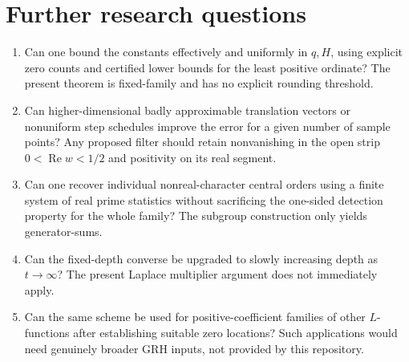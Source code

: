 \documentclass[11pt]{article}
\theoremstyle{remark}\newtheorem{remark}[theorem]{Remark}
\newcommand{\Rea}{\operatorname{Re}}
\begin{document}
\section{Further research questions}
\begin{enumerate}
\item Can one bound the constants effectively and uniformly in $q,H$, using explicit zero counts and certified lower bounds for the least positive ordinate? The present theorem is fixed-family and has no explicit rounding threshold.
\item Can higher-dimensional badly approximable translation vectors or nonuniform step schedules improve the error for a given number of sample points? Any proposed filter should retain nonvanishing in the open strip $0<\Rea w<1/2$ and positivity on its real segment.
\item Can one recover individual nonreal-character central orders using a finite system of real prime statistics without sacrificing the one-sided detection property for the whole family? The subgroup construction only yields generator-sums.
\item Can the fixed-depth converse be upgraded to slowly increasing depth as $t\to\infty$? The present Laplace multiplier argument does not immediately apply.
\item Can the same scheme be used for positive-coefficient families of other $L$-functions after establishing suitable zero locations? Such applications would need genuinely broader GRH inputs, not provided by this repository.
\end{enumerate}
\end{document}
